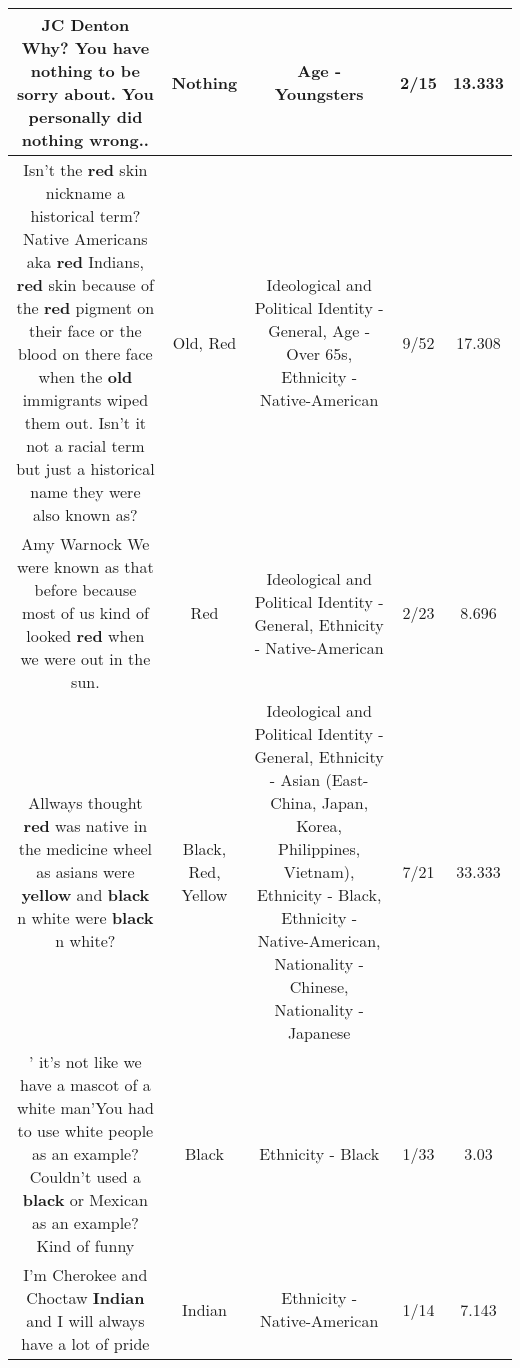 \documentclass[11pt]{article}
\newlength\mylength
\begin{document}
\begin{center}
\begin{longtable}{|C{.65\mylength}|C{.30\mylength}|C{.12\mylength}|C{.12\mylength}|C{.12\mylength}|}
  \small JC Denton Why? You have \textbf{nothing} to be sorry about. You personally did \textbf{nothing} wrong..\normalsize   & Nothing & Age - Youngsters & 2/15 & 13.333 \\  \hline
  \small Isn't the \textbf{r\textbf{ed}} skin nickname a historical term? Native Americans aka \textbf{r\textbf{ed}} Indians, \textbf{r\textbf{ed}} skin because of the \textbf{r\textbf{ed}} pigment on their face or the blood on there face when the \textbf{old} immigrants wiped them out. Isn't it not a racial term but just a historical name they were also known as?\normalsize   & Old, Red &  Ideological and Political Identity - General, Age - Over 65s, Ethnicity - Native-American & 9/52 & 17.308 \\  \hline
  \small Amy Warnock We were known as that before because most of us kind of looked \textbf{r\textbf{ed}} when we were out in the sun.\normalsize   & Red &  Ideological and Political Identity - General, Ethnicity - Native-American & 2/23 & 8.696 \\  \hline
  \small Allways thought \textbf{r\textbf{ed}} was native in the medicine wheel as asians were \textbf{y\textbf{e\textbf{llow}}} and \textbf{black} n white were \textbf{black} n white?\normalsize   & Black, Red, Yellow &  Ideological and Political Identity - General, Ethnicity - Asian (East- China, Japan, Korea, Philippines, Vietnam), Ethnicity - Black, Ethnicity - Native-American, Nationality - Chinese, Nationality - Japanese & 7/21 & 33.333 \\  \hline
  \small ' it's not like we have a mascot of a white man'You had to use white people as an example? Couldn't used a \textbf{black} or Mexican as an example? Kind of funny\normalsize   & Black & Ethnicity - Black & 1/33 & 3.03 \\  \hline
  \small I'm Cherokee and Choctaw \textbf{Indian} and I will always have a lot of pride\normalsize   & Indian & Ethnicity - Native-American & 1/14 & 7.143 \\  \hline

\end{longtable}
\end{center}
\end{document}
